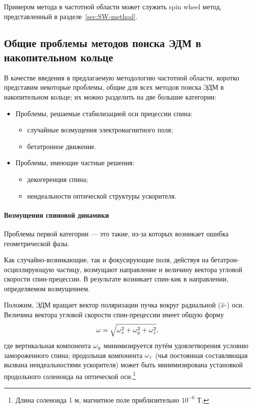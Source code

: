 Примером метода в частотной области может служить spin wheel метод, представленный в разделе~\ref{sec:SW-method}.

%

\subsection{Общие проблемы методов поиска ЭДМ в накопительном кольце}\label{sec:FSSREDM:problems}
В качестве введения в предлагаемую методологию частотной области, коротко представим 
некоторые проблемы, общие для всех методов поиска ЭДМ в накопительном кольце; их можно
разделить на две большие категории:

\begin{itemize}
	\item Проблемы, решаемые стабилизацией оси прецессии спина:
	\begin{itemize}
		\item случайные возмущения электромагнитного поля;
		\item бетатронное движение.
	\end{itemize}
	\item Проблемы, имеющие частные решения:
	\begin{itemize}
		\item декогеренция спина;
		\item неидеальности оптической структуры ускорителя.
	\end{itemize}
\end{itemize}

\paragraph{Возмущения спиновой динамики}\label{chap1:par:smp}
Проблемы первой категории --- это такие, из-за которых возникает ошибка геометрической фазы.

Как случайно-возникающие, так и фокусирующие поля, действуя на бетатрон-осциллирующую частицу,
возмущают направление и величину вектора угловой скорости спин-прецессии. 
В результате возникает спин-кик в направлении, определяемом возмущением.

Положим, ЭДМ вращает вектор поляризации пучка вокруг радиальной ($\hat x$-) оси. 
Величина вектора угловой скорости спин-прецессии имеет общую форму
\[
\omega = \sqrt{\omega_x^2 + \omega_y^2 + \omega_z^2},
\]
где  вертикальная компонента $\omega_y$ минимизируется путём удовлетворения условию замороженного спина;
 продольная компонента $\omega_z$ (чья постоянная составляющая вызвана неидеальностями ускорителя) 
 может быть минимизирована установкой продольного соленоида на оптической оси.\footnote{Длина соленоида 1 м, 
 	магнитное поле приблизительно $10^{-6}$ Т.}

